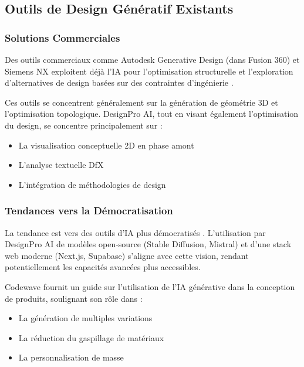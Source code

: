 \subsection{Outils de Design Génératif Existants}

\subsubsection{Solutions Commerciales}

Des outils commerciaux comme Autodesk Generative Design (dans Fusion 360) et Siemens NX exploitent déjà l'IA pour l'optimisation structurelle et l'exploration d'alternatives de design basées sur des contraintes d'ingénierie \cite{buonamici2020generative, rawat2023}.

Ces outils se concentrent généralement sur la génération de géométrie 3D et l'optimisation topologique. DesignPro AI, tout en visant également l'optimisation du design, se concentre principalement sur :
\begin{itemize}[leftmargin=*]
    \item La visualisation conceptuelle 2D en phase amont
    \item L'analyse textuelle DfX
    \item L'intégration de méthodologies de design
\end{itemize}

\subsubsection{Tendances vers la Démocratisation}

La tendance est vers des outils d'IA plus démocratisés \cite{eimt2025future, parivedaolutions2025}. L'utilisation par DesignPro AI de modèles open-source (Stable Diffusion, Mistral) et d'une stack web moderne (Next.js, Supabase) s'aligne avec cette vision, rendant potentiellement les capacités avancées plus accessibles.

Codewave \cite{codewave2025} fournit un guide sur l'utilisation de l'IA générative dans la conception de produits, soulignant son rôle dans :
\begin{itemize}[leftmargin=*]
    \item La génération de multiples variations
    \item La réduction du gaspillage de matériaux
    \item La personnalisation de masse
\end{itemize}

